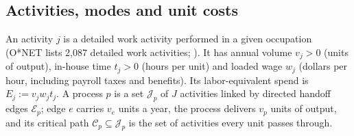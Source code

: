 \subsection{Activities, modes and unit costs}\label{sec:tasks-setup}

\begin{definition}\label{def:tasks-activity}
An activity $j$ is a detailed work activity performed in a given occupation (O*NET lists 2,087 detailed work activities; \citealp{onet2026database}). It has annual volume $v_j>0$ (units of output), in-house time $t_j>0$ (hours per unit) and loaded wage $w_j$ (dollars per hour, including payroll taxes and benefits). Its labor-equivalent spend is $E_j:=v_jw_jt_j$. A process $p$ is a set $\mathcal J_p$ of $J$ activities linked by directed handoff edges $\mathcal E_p$; edge $e$ carries $v_e$ units a year, the process delivers $v_p$ units of output, and its critical path $\mathcal C_p\subseteq\mathcal J_p$ is the set of activities every unit passes through.
\end{definition}

